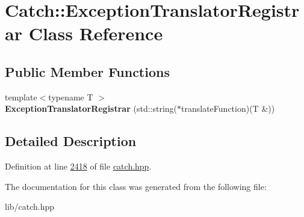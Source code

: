 \hypertarget{classCatch_1_1ExceptionTranslatorRegistrar}{}\section{Catch\+::Exception\+Translator\+Registrar Class Reference}
\label{classCatch_1_1ExceptionTranslatorRegistrar}
\subsection*{Public Member Functions}
\begin{DoxyCompactItemize}
\item 
\mbox{\label{classCatch_1_1ExceptionTranslatorRegistrar_aa73229de911f26b1df6c6c87c4d9e04e}} 
{\footnotesize template$<$typename T $>$ }\\{\bfseries Exception\+Translator\+Registrar} (std\+::string($\ast$translate\+Function)(T \&))
\end{DoxyCompactItemize}


\subsection{Detailed Description}


Definition at line \mbox{\hyperlink{catch_8hpp_source_l02418}{2418}} of file \mbox{\hyperlink{catch_8hpp_source}{catch.\+hpp}}.



The documentation for this class was generated from the following file\+:\begin{DoxyCompactItemize}
\item 
lib/catch.\+hpp\end{DoxyCompactItemize}
